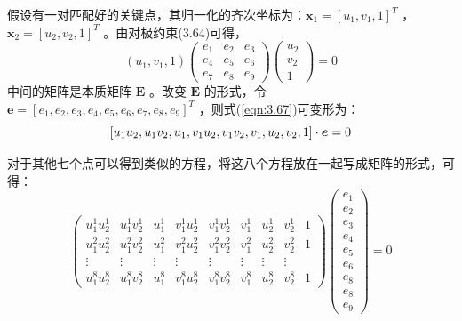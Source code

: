 假设有一对匹配好的关键点，其归一化的齐次坐标为：$\boldsymbol{x}_{1}=\left[u_{1}, v_{1}, 1\right]^{T}$ ，$\boldsymbol{x}_{2}=\left[u_{2}, v_{2}, 1\right]^{T}  $ 。由对极约束(3.64)可得，
\begin{equation}
\label{eqn:3.67}
\left(u_{1}, v_{1}, 1\right) \left( \begin{array}{ccc}{e_{1}} & {e_{2}} & {e_{3}} \\ {e_{4}} & {e_{5}} & {e_{6}} \\ {e_{7}} & {e_{8}} & {e_{9}}\end{array}\right) \left( \begin{array}{l}{u_{2}} \\ {v_{2}} \\ {1}\end{array}\right)=0
\end{equation}
中间的矩阵是本质矩阵 $\bm{E} $ 。改变 $\bm{E} $ 的形式，令 $ \boldsymbol e=\left[e_{1}, e_{2}, e_{3}, e_{4}, e_{5}, e_{6}, e_{7}, e_{8}, e_{9}\right]^{T} $ ，则式(\ref{eqn:3.67})可变形为：
\begin{equation}
\label{eqn:3.68}
\setlength{\abovedisplayskip}{6pt}
\setlength{\belowdisplayskip}{6pt}
\left[u_{1} u_{2}, u_{1} v_{2}, u_{1}, v_{1} u_{2}, v_{1} v_{2}, v_{1}, u_{2}, v_{2}, 1\right] \cdot \boldsymbol e=0
\end{equation}

对于其他七个点可以得到类似的方程，将这八个方程放在一起写成矩阵的形式，可得：
\begin{equation}
\label{eqn:3.69}
\left( \begin{array}{ccccccccc}
{u_{1}^{1} u_{2}^{1}} & {u_{1}^{1} v_{2}^{1}} & {u_{1}^{1}} & {v_{1}^{1} u_{2}^{1}} & {v_{1}^{1} v_{2}^{1}} & {v_{1}^{1}} & {u_{2}^{1}} & {v_{2}^{1}} & {1}  \\ 
{u_{1}^{2} u_{2}^{2}} & {u_{1}^{2} v_{2}^{2}} & {u_{1}^{2}} & {v_{1}^{2} u_{2}^{2}} & {v_{1}^{2} v_{2}^{2}} & {v_{1}^{2}} & {u_{2}^{2}} & {v_{2}^{2}} & {1} \\ 
{\vdots} & {\vdots} & {\vdots} & {\vdots} & {\vdots} & {\vdots} & {\vdots} & {\vdots} \\ 
{u_{1}^{8} u_{2}^{8}} & {u_{1}^{8} v_{2}^{8}} & {u_{1}^{8}} & {v_{1}^{8} u_{2}^{8}} & {v_{1}^{8} v_{2}^{8}} & {v_{1}^{8}} & {u_{2}^{8}} & {v_{2}^{8}} & {1}
\end{array}\right)
\left( \begin{array}{c}{e_{1}} \\ {e_{2}} \\ {e_{3}} \\ {e_{4}} \\ {e_{5}} \\ {e_{6}} \\ {e_{8}} \\ {e_{8}} \\ {e_{9}}\end{array}\right)
=0
\end{equation}


